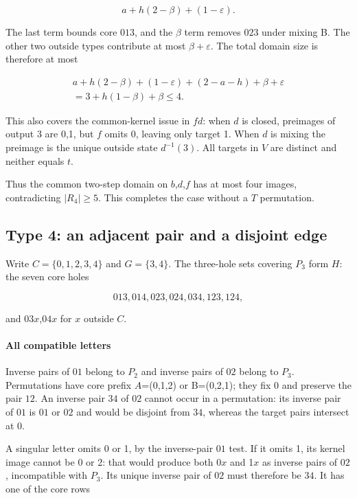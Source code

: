 \documentclass[11pt]{article}
\theoremstyle{definition}
\theoremstyle{plain}
\begin{document}
\[
a+h(2-\beta)+(1-\varepsilon).
\]

The last term bounds core \(013\), and the \(\beta\) term removes \(023\) under
mixing B. The other two outside types contribute at most \(\beta+\varepsilon\).
The total domain size is therefore at most

\[
\begin{aligned}a+h(2-\beta)+(1-\varepsilon)+(2-a-h)+\beta+\varepsilon\\=3+h(1-\beta)+\beta\le4.\end{aligned}
\]

This also covers the common-kernel issue in \(fd\): when \(d\) is closed,
preimages of output 3 are 0,1, but \(f\) omits 0, leaving only target 1.
When \(d\) is mixing the preimage is the unique outside state
\(d^{-1}(3)\). All targets in \(V\) are distinct and neither equals
\(t\).

Thus the common two-step domain on \(b\),\(d\),\(f\) has at most four
images, contradicting \(|R_{4}|\ge 5\). This completes the case without a \(T\) permutation.

\subsection{Type 4: an adjacent pair and a disjoint edge}\label{disjoint-tail-early-type-4-exclusion-at-codimension-three}

Write
\(C=\{0,1,2,3,4\}\) and \(G=\{3,4\}\). The three-hole sets covering
\(P_{3}\) form \(H\): the seven core holes

\[
013,014,023,024,034,123,124,
\]

and \(03x\),\(04x\) for \(x\) outside \(C\).

\paragraph{All compatible letters}\label{all-compatible-letters}

Inverse pairs of \(01\) belong to \(P_{2}\) and
inverse pairs of \(02\) belong to \(P_{3}\). Permutations have core prefix
\(A\)=(0,1,2) or B=(0,2,1); they fix 0 and preserve the pair \(12\). An
inverse pair \(34\) of \(02\) cannot occur in a permutation: its inverse
pair of \(01\) is \(01\) or \(02\) and would be disjoint from \(34\), whereas the target
pairs intersect at 0.

A singular letter omits 0 or 1, by the inverse-pair \(01\) test. If it
omits 1, its kernel image cannot be 0 or 2: that would produce both
0\(x\) and 1\(x\) as inverse pairs of \(02\), incompatible with \(P_{3}\).
Its unique inverse pair of \(02\) must therefore be \(34\). It has one of the
core rows
\end{document}
